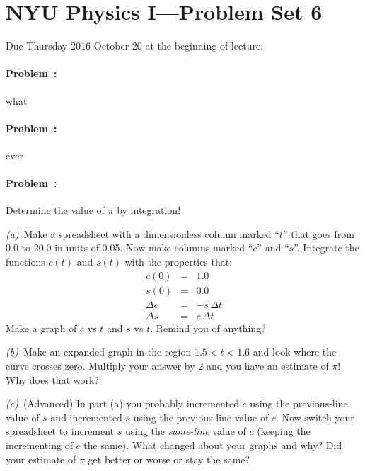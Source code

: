 \documentclass[12pt]{article}
\begin{document}
\section*{NYU Physics I---Problem Set 6}

Due Thursday 2016 October 20 at the beginning of lecture.

\paragraph{Problem~\theproblem:}%
what

\paragraph{Problem~\theproblem:}%
ever

\paragraph{Problem~\theproblem:}%
Determine the value of $\pi$ by integration!

\textsl{(a)}~Make a spreadsheet with a dimensionless column marked
``$t$'' that goes from 0.0 to 20.0 in units of 0.05.  Now make columns
marked ``$c$'' and ``$s$''.  Integrate the functions $c(t)$ and
$s(t)$ with the properties that:
\begin{eqnarray}\displaystyle
c(0) & = & 1.0 \\
s(0) & = & 0.0 \\
\Delta c & = & -s\,\Delta t \\
\Delta s & = & c\,\Delta t
\end{eqnarray}
Make a graph of $c$ vs $t$ and $s$ vs $t$.  Remind you of anything?

\textsl{(b)}~Make an expanded graph in the region $1.5<t<1.6$ and
look where the curve crosses zero.  Multiply your answer by 2 and you
have an estimate of $\pi$!  Why does that work?

\textsl{(c)}~(Advanced) In part (a) you probably incremented $c$ using
the previous-line value of $s$ and incremented $s$ using the
previous-line value of $c$.  Now switch your spreadsheet to increment
$s$ using the \emph{same-line} value of $c$ (keeping the incrementing
of $c$ the same).  What changed about your graphs and why?  Did your
estimate of $\pi$ get better or worse or stay the same?
\end{document}
